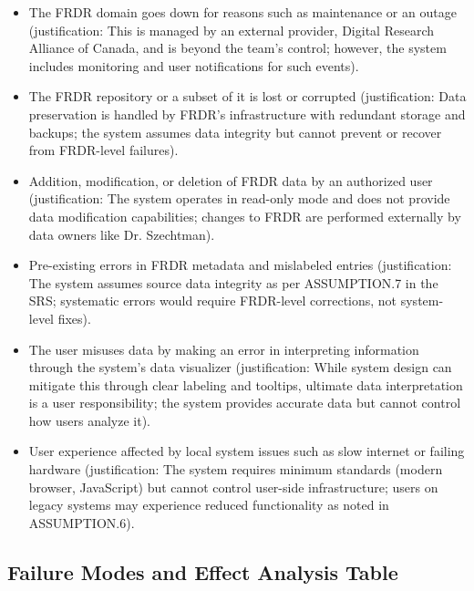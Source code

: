 \documentclass{article}
\begin{document}
\begin{itemize}
    \item The FRDR domain goes down for reasons such as maintenance or an outage (justification: This is managed by an external provider, Digital Research Alliance of Canada, and is beyond the team's control; however, the system includes monitoring and user notifications for such events).
    \item The FRDR repository or a subset of it is lost or corrupted (justification: Data preservation is handled by FRDR's infrastructure with redundant storage and backups; the system assumes data integrity but cannot prevent or recover from FRDR-level failures).
    \item Addition, modification, or deletion of FRDR data by an authorized user (justification: The system operates in read-only mode and does not provide data modification capabilities; changes to FRDR are performed externally by data owners like Dr. Szechtman).
    \item Pre-existing errors in FRDR metadata and mislabeled entries (justification: The system assumes source data integrity as per ASSUMPTION.7 in the SRS; systematic errors would require FRDR-level corrections, not system-level fixes).
    \item The user misuses data by making an error in interpreting information through the system's data visualizer (justification: While system design can mitigate this through clear labeling and tooltips, ultimate data interpretation is a user responsibility; the system provides accurate data but cannot control how users analyze it).
    \item User experience affected by local system issues such as slow internet or failing hardware (justification: The system requires minimum standards (modern browser, JavaScript) but cannot control user-side infrastructure; users on legacy systems may experience reduced functionality as noted in ASSUMPTION.6).
\end{itemize}

\subsection{Failure Modes and Effect Analysis Table}
\end{document}
